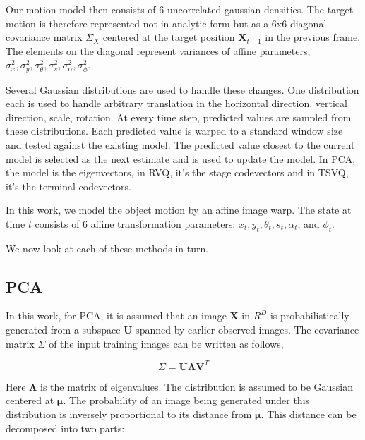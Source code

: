 Our motion model then consists of 6 uncorrelated gaussian densities. 
The target motion is therefore represented not in analytic form but as a 6x6 diagonal covariance matrix $\Sigma_X$ centered at the target position $\mathbf{X}_{t-1}$ in the previous frame.  The elements on the diagonal represent variances of affine parameters, $\sigma_x^2, \sigma_y^2, \sigma_\theta^2, \sigma_s^2, \sigma_\alpha^2, \sigma_\phi^2$.   


Several Gaussian distributions are used to handle these changes.  One distribution each is used to handle arbitrary translation in the horizontal direction, vertical direction, scale, rotation.  At every time step, predicted values are sampled from these distributions.  Each predicted value is warped to a standard window size and tested against the existing model.  The predicted value closest to the current model is selected as the next estimate and is used to update the model.  In PCA, the model is the eigenvectors, in RVQ, it's the stage codevectors and in TSVQ, it's the terminal codevectors.  

In this work, we model the object motion by an affine image warp.  The state at time $t$ consists of 6 affine transformation parameters: $x_t,  y_t, \theta_t, s_t, \alpha_t$, and $\phi_t$.



We now look at each of these methods in turn.

\subsection{PCA}

In this work, for PCA, it is assumed that an image $\mathbf{X}$ in $R^D$ is probabilistically generated from a subspace $\mathbf{U}$ spanned by earlier observed images.  The covariance matrix $\Sigma$ of the input training images can be written as follows,  

\begin{equation}
\Sigma = \mathbf{U}\mathbf{\Lambda} \mathbf{V}^T
\end{equation}

Here $\mathbf{\Lambda}$ is the matrix of eigenvalues.  The distribution is assumed to be Gaussian centered at $\mathbf{\mu}$.  The probability of an image being generated under this distribution is inversely proportional to its distance from $\mathbf{\mu}$.  This distance can be decomposed into two parts:

